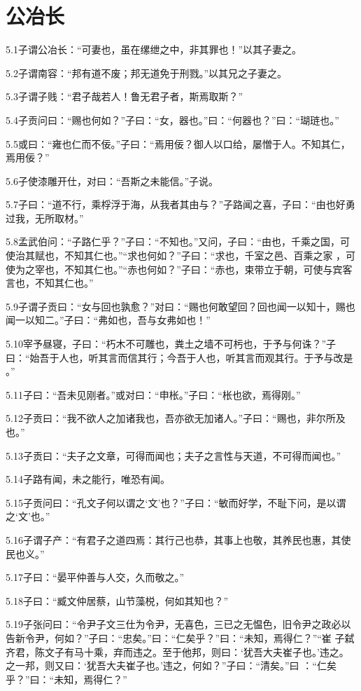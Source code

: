 \documentclass[a4paper,12pt,UTF8,twoside]{ctexbook}
\begin{document}
\chapter{公冶长}
5.1子谓公冶长：“可妻也，虽在缧绁之中，非其罪也！”以其子妻之。

5.2子谓南容：“邦有道不废；邦无道免于刑戮。”以其兄之子妻之。

5.3子谓子贱：“君子哉若人！鲁无君子者，斯焉取斯？”

5.4子贡问曰：“赐也何如？”子曰：“女，器也。”曰：“何器也？”曰：“瑚琏也。”

5.5或曰：“雍也仁而不佞。”子曰：“焉用佞？御人以口给，屡憎于人。不知其仁，焉用佞？”

5.6子使漆雕开仕，对曰：“吾斯之未能信。”子说。

5.7子曰：“道不行，乘桴浮于海，从我者其由与？”子路闻之喜，子曰：“由也好勇过我，无所取材。”

5.8孟武伯问：“子路仁乎？”子曰：“不知也。”又问，子曰：“由也，千乘之国，可使治其赋也，不知其仁也。”“求也何如？”子曰：“求也，千室之邑、百乘之家
，可使为之宰也，不知其仁也。”“赤也何如？”子曰：“赤也，束带立于朝，可使与宾客言也，不知其仁也。”

5.9子谓子贡曰：“女与回也孰愈？”对曰：“赐也何敢望回？回也闻一以知十，赐也闻一以知二。”子曰：“弗如也，吾与女弗如也！”

5.10宰予昼寝，子曰：“朽木不可雕也，粪土之墙不可杇也，于予与何诛？”子曰：“始吾于人也，听其言而信其行；今吾于人也，听其言而观其行。于予与改是
。”

5.11子曰：“吾未见刚者。”或对曰：“申枨。”子曰：“枨也欲，焉得刚。”

5.12子贡曰：“我不欲人之加诸我也，吾亦欲无加诸人。”子曰：“赐也，非尔所及也。”

5.13子贡曰：“夫子之文章，可得而闻也；夫子之言性与天道，不可得而闻也。”

5.14子路有闻，未之能行，唯恐有闻。

5.15子贡问曰：“孔文子何以谓之‘文’也？”子曰：“敏而好学，不耻下问，是以谓之‘文’也。”

5.16子谓子产：“有君子之道四焉：其行己也恭，其事上也敬，其养民也惠，其使民也义。”

5.17子曰：“晏平仲善与人交，久而敬之。”

5.18子曰：“臧文仲居蔡，山节藻棁，何如其知也？”

5.19子张问曰：“令尹子文三仕为令尹，无喜色，三已之无愠色，旧令尹之政必以告新令尹，何如？”子曰：“忠矣。”曰：“仁矣乎？”曰：“未知，焉得仁？”“崔
子弑齐君，陈文子有马十乘，弃而违之。至于他邦，则曰：‘犹吾大夫崔子也。’违之。之一邦，则又曰：‘犹吾大夫崔子也。’违之，何如？”子曰：“清矣。”曰
：“仁矣乎？”曰：“未知，焉得仁？”
\end{document}
